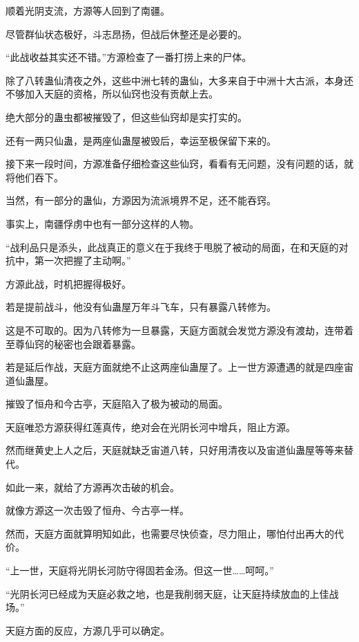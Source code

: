 
\begin{this_body}

顺着光阴支流，方源等人回到了南疆。

尽管群仙状态极好，斗志昂扬，但战后休整还是必要的。

“此战收益其实还不错。”方源检查了一番打捞上来的尸体。

除了八转蛊仙清夜之外，这些中洲七转的蛊仙，大多来自于中洲十大古派，本身还不够加入天庭的资格，所以仙窍也没有贡献上去。

绝大部分的蛊虫都被摧毁了，但这些仙窍却是实打实的。

还有一两只仙蛊，是两座仙蛊屋被毁后，幸运至极保留下来的。

接下来一段时间，方源准备仔细检查这些仙窍，看看有无问题，没有问题的话，就将他们吞下。

当然，有一部分的蛊仙，方源因为流派境界不足，还不能吞窍。

事实上，南疆俘虏中也有一部分这样的人物。

“战利品只是添头，此战真正的意义在于我终于甩脱了被动的局面，在和天庭的对抗中，第一次把握了主动啊。”

方源此战，时机把握得极好。

若是提前战斗，他没有仙蛊屋万年斗飞车，只有暴露八转修为。

这是不可取的。因为八转修为一旦暴露，天庭方面就会发觉方源没有渡劫，连带着至尊仙窍的秘密也会跟着暴露。

若是延后作战，天庭方面就绝不止这两座仙蛊屋了。上一世方源遭遇的就是四座宙道仙蛊屋。

摧毁了恒舟和今古亭，天庭陷入了极为被动的局面。

天庭唯恐方源获得红莲真传，绝对会在光阴长河中增兵，阻止方源。

然而继黄史上人之后，天庭就缺乏宙道八转，只好用清夜以及宙道仙蛊屋等等来替代。

如此一来，就给了方源再次击破的机会。

就像方源这一次击毁了恒舟、今古亭一样。

然而，天庭方面就算明知如此，也需要尽快侦查，尽力阻止，哪怕付出再大的代价。

“上一世，天庭将光阴长河防守得固若金汤。但这一世……呵呵。”

“光阴长河已经成为天庭必救之地，也是我削弱天庭，让天庭持续放血的上佳战场。”

天庭方面的反应，方源几乎可以确定。


\end{this_body}
